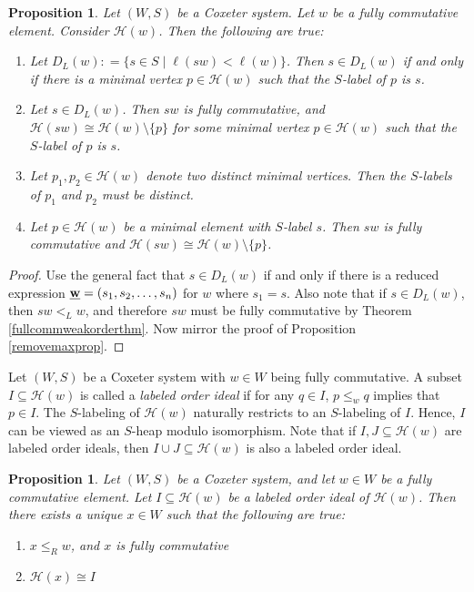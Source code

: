 \documentclass{amsart}
\theoremstyle{plain} %
\newtheorem{prop}[thm]{Proposition}
\theoremstyle{definition}
\def\weakr{\leq_{R}}
\def\sweakl{<_{L}}
\def\H#1{\mathcal{H}(#1)}
\begin{document}
\begin{prop} \label{removeminprop}
    Let $ (W,S)$ be a Coxeter system. Let $ w$ be a fully commutative element. Consider $\H{w}$. Then the following are true:

    \begin{enumerate}
        \item Let $ D_{L}(w) : = \{ s\in S \mid \ell(sw) < \ell(w)  \}$.
        Then $ s\in D_{L}(w)$ if and only if there is a minimal vertex $ p\in \H{w}$ such that the $S$-label of $ p$ is $s$.

        \item Let $ s\in D_{L}(w)$. Then $ sw$ is fully commutative, and $ \H{sw}\cong \H{w} \setminus \{ p \}$ for some minimal vertex $p\in \H{w}$ such that the $S$-label of $p$ is $s$.

        \item Let $ p_{1}, p_{2} \in \H{w}$ denote two distinct minimal vertices. Then the $S$-labels of $ p_{1}$ and $p_{2}$ must be distinct.

        \item Let $ p \in \H{w}$ be a minimal element with $ S$-label $s$. Then $ sw$ is fully commutative and $ \H{sw} \cong \H{w} \setminus \{ p  \}$.

    \end{enumerate}
\end{prop}

\begin{proof}
    Use the general fact that $ s\in D_{L}(w)$ if and only if there is a reduced expression $ \textbf{\underline{w}} = (s_{1}, s_{2}, \dots , s_{n})$ for $ w$ where $ s_{1} = s$. Also note that if $ s\in D_{L}(w)$, then $sw \sweakl w$, and therefore $ sw$ must be fully commutative by Theorem \ref{fullcommweakorderthm}. Now mirror the proof of Proposition \ref{removemaxprop}.
\end{proof}
Let $ (W,S)$ be a Coxeter system with $ w\in W$ being fully commutative. A subset $ I \subseteq \H{w}$ is called a \emph{labeled order ideal} if for any $ q\in I$, $ p \leq_{w} q$ implies that $ p \in I$. The $S$-labeling of $ \H{w}$ naturally restricts to an $S$-labeling of $I$. Hence, $I$ can be viewed as an $S$-heap modulo isomorphism. Note that if $I, J \subseteq \H{w}$ are labeled order ideals, then $I \cup J \subseteq \H{w}$ is also a labeled order ideal.


\begin{prop} \label{existscorrprop}
    Let $ (W,S )$ be a Coxeter system, and let $ w\in W$ be a fully commutative element. Let $I \subseteq \H{w}$ be a labeled order ideal of $ \H{w}$. Then there exists a unique $ x\in W$ such that the following are true:

    \begin{enumerate}
        \item $ x \weakr w$, and $ x$ is fully commutative

        \item $ \H{x} \cong I$
    \end{enumerate}
\end{prop}
\end{document}
